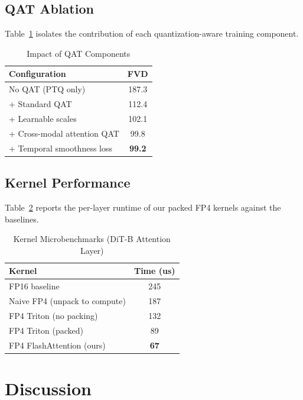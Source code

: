 \documentclass[journal,twoside]{IEEEtran}
\theoremstyle{definition}
\theoremstyle{remark}
\begin{document}
\subsection{QAT Ablation}

Table~\ref{tab:qat_ablation} isolates the contribution of each quantization-aware training component.

\begin{table}[H]
\centering
\caption{Impact of QAT Components}
\label{tab:qat_ablation}
\begin{tabular}{lc}
\hline
Configuration & FVD \\
\hline
No QAT (PTQ only) & 187.3 \\
+ Standard QAT & 112.4 \\
+ Learnable scales & 102.1 \\
+ Cross-modal attention QAT & 99.8 \\
+ Temporal smoothness loss & \textbf{99.2} \\
\hline
\end{tabular}
\end{table}

\subsection{Kernel Performance}

Table~\ref{tab:kernels} reports the per-layer runtime of our packed FP4 kernels against the baselines.

\begin{table}[H]
\centering
\caption{Kernel Microbenchmarks (DiT-B Attention Layer)}
\label{tab:kernels}
\begin{tabular}{lc}
\hline
Kernel & Time (us) \\
\hline
FP16 baseline & 245 \\
Naive FP4 (unpack to compute) & 187 \\
FP4 Triton (no packing) & 132 \\
FP4 Triton (packed) & 89 \\
FP4 FlashAttention (ours) & \textbf{67} \\
\hline
\end{tabular}
\end{table}

\section{Discussion}
\label{sec:discussion}
\end{document}
